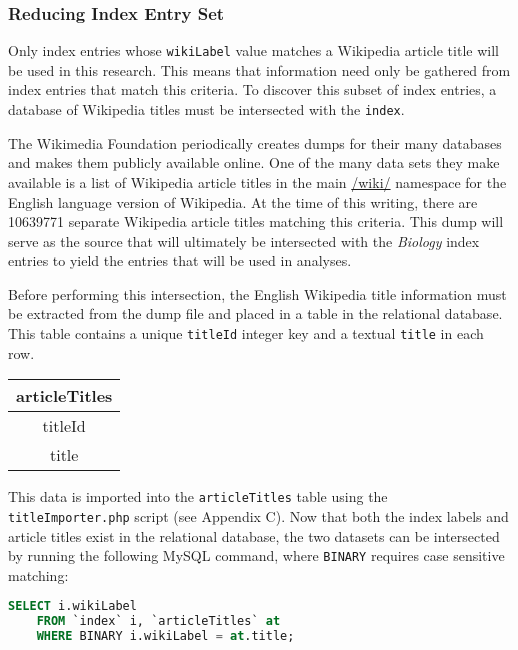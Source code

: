 \subsubsection{Reducing Index Entry Set}
\label{subsec:reducing}

Only index entries whose {\tt wikiLabel} value matches a Wikipedia article title will be used in this research.
This means that information need only be gathered from index entries that match this criteria.
To discover this subset of index entries, a database of Wikipedia titles must be intersected with the {\tt index}.

The Wikimedia Foundation periodically creates dumps for their many databases and makes them publicly available online\cite{wiki-dumps}.
One of the many data sets they make available is a list of Wikipedia article titles in the main \url{/wiki/} namespace for the English language version of Wikipedia\cite{wiki-dump-titles}.
At the time of this writing, there are 10639771 separate Wikipedia article titles matching this criteria.
This dump will serve as the source that will ultimately be intersected with the {\it Biology} index entries to yield the entries that will be used in analyses.

Before performing this intersection, the English Wikipedia title information must be extracted from the dump file and placed in a table in the relational database.
This table contains a unique {\tt titleId} integer key and a textual {\tt title} in each row.

\begin{center}
\begin{tabular}{|c|}
\hline 
{\bf articleTitles} \\ 
\hline 
titleId \\ 
\hline 
title \\ 
\hline 
\end{tabular} 
\end{center}

This data is imported into the {\tt articleTitles} table using the {\tt titleImporter.php} script (see Appendix C).
Now that both the index labels and article titles exist in the relational database, the two datasets can be intersected by running the following MySQL command, where {\tt BINARY} requires case sensitive matching:

\begin{lstlisting}[language=SQL]
SELECT i.wikiLabel
    FROM `index` i, `articleTitles` at
    WHERE BINARY i.wikiLabel = at.title;
\end{lstlisting}

